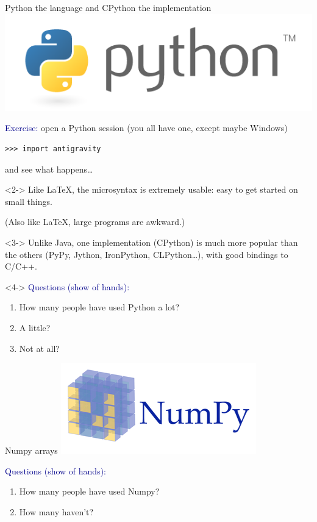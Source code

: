 \documentclass[aspectratio=169]{beamer}
\begin{document}
\begin{frame}[fragile]{Python the language and CPython the implementation}
\vspace{0.5 cm}
\hfill \includegraphics[height=1 cm]{python-logo.png}

\vspace{-1 cm}
\textcolor{darkblue}{Exercise:} open a Python session {\scriptsize (you all have one, except maybe Windows)}

\small
\begin{verbatim}
>>> import antigravity
\end{verbatim}
\normalsize

and see what happens\ldots

\vspace{0.5 cm}
\begin{uncoverenv}<2->
Like \LaTeX, the microsyntax is extremely usable: easy to get started on small things.

(Also like \LaTeX, large programs are awkward.)
\end{uncoverenv}

\vspace{0.5 cm}
\begin{uncoverenv}<3->
Unlike Java, one implementation (CPython) is much more popular than the others (PyPy, Jython, IronPython, CLPython\ldots), with good bindings to C/C++.
\end{uncoverenv}

\vspace{0.5 cm}
\begin{uncoverenv}<4->
\small
\textcolor{darkblue}{Questions (show of hands):}
\vspace{-0.2 cm}
\begin{enumerate}\setlength{\itemsep}{-0.1 cm}
\item How many people have used Python a lot?
\item A little?
\item Not at all?
\end{enumerate}
\end{uncoverenv}
\end{frame}

\begin{frame}{Numpy arrays}
\vspace{0.25 cm}
\hfill \includegraphics[height=1.3 cm]{numpy-logo.png}

\vspace{-1.3 cm}

\vfill
\small
\textcolor{darkblue}{Questions (show of hands):}
\vspace{-0.2 cm}
\begin{enumerate}\setlength{\itemsep}{-0.1 cm}
\item How many people have used Numpy?
\item How many haven't?
\end{enumerate}
\end{frame}
\end{document}
